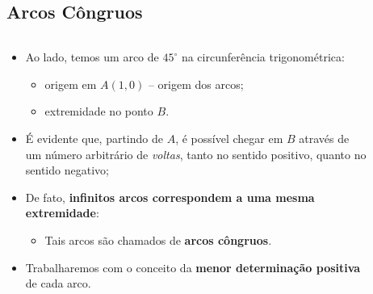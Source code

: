 \subsection{Arcos Côngruos}
\begin{frame}
  \begin{columns}[onlytextwidth]
    \begin{column}{0.49\textwidth}
      \vspace*{-0.5cm}
      \begin{highlight}
        \begin{itemize}
          \item Ao lado, temos um arco de $45^{\circ}$ na circunferência trigonométrica:
          \begin{itemize}
            \item origem em $A(1,0)$ -- origem dos arcos;
            \item extremidade no ponto $B$.
          \end{itemize}
          \item É evidente que, partindo de $A$, é possível chegar em $B$ através de um número arbitrário de \emph{voltas}, tanto no sentido positivo, quanto no sentido negativo;
          \item De fato, \textbf{infinitos arcos correspondem a uma mesma extremidade}:
          \begin{itemize}
            \item Tais arcos são chamados de \textbf{arcos côngruos}.
          \end{itemize}
          \item Trabalharemos com o conceito da \textbf{menor determinação positiva} de cada arco.
        \end{itemize}
      \end{highlight}
    \end{column}
    \begin{column}{0.49\textwidth}
      \vspace*{-0.5cm}
      \begin{figure}
      \end{figure}
    \end{column}
  \end{columns}
\end{frame}

